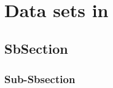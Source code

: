~\newpage
\section{Data sets in \pp}
\label{sec:Section02}

\subsection{SbSection}
\label{sec:Section02.a-}

\subsubsection{Sub-Sbsection}